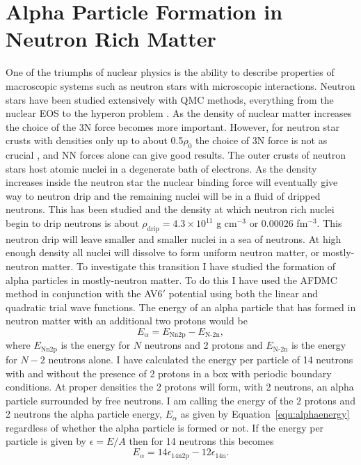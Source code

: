 \chapter{Alpha Particle Formation in Neutron Rich Matter}
One of the triumphs of nuclear physics is the ability to describe properties of macroscopic systems such as neutron stars with microscopic interactions. Neutron stars have been studied extensively with QMC methods, everything from the nuclear EOS \cite{sarsa2003,gandolfi2014} to the hyperon problem \cite{lonardoni2015,gandolfi2018}. As the density of nuclear matter increases the choice of the 3N force becomes more important. However, for neutron star crusts with densities only up to about 0.5$\rho_0$ the choice of 3N force is not as crucial \cite{gandolfi2009}, and NN forces alone can give good results. The outer crusts of neutron stars host atomic nuclei in a degenerate bath of electrons. As the density increases inside the neutron star the nuclear binding force will eventually give way to neutron drip and the remaining nuclei will be in a fluid of dripped neutrons. This has been studied \cite{lorenz1993,chamel2015} and the density at which neutron rich nuclei begin to drip neutrons is about $\rho_\text{drip} = 4.3\times10^{11}$ g cm$^{-3}$ or 0.00026 fm$^{-3}$. This neutron drip will leave smaller and smaller nuclei in a sea of neutrons. At high enough density all nuclei will dissolve to form uniform neutron matter, or mostly-neutron matter. To investigate this transition I have studied the formation of alpha particles in mostly-neutron matter. To do this I have used the AFDMC method in conjunction with the AV6$'$ potential using both the linear and quadratic trial wave functions. The energy of an alpha particle that has formed in neutron matter with an additional two protons would be
\begin{equation}
   E_\alpha = E_\text{Nn2p} - E_\text{N-2n},
   \label{equ:alphaenergy}
\end{equation}
where $E_\text{Nn2p}$ is the energy for $N$ neutrons and 2 protons and $E_\text{N-2n}$ is the energy for $N-2$ neutrons alone. I have calculated the energy per particle of 14 neutrons with and without the presence of 2 protons in a box with periodic boundary conditions. At proper densities the 2 protons will form, with 2 neutrons, an alpha particle surrounded by free neutrons. I am calling the energy of the 2 protons and 2 neutrons the alpha particle energy, $E_\alpha$ as given by Equation~\ref{equ:alphaenergy} regardless of whether the alpha particle is formed or not. If the energy per particle is given by $\epsilon = E/A$ then for 14 neutrons this becomes
\begin{equation}
   E_\alpha = 14\epsilon_\text{14n2p} - 12\epsilon_\text{14n}.
   \label{equ:alphaenergy14n2p}
\end{equation}

